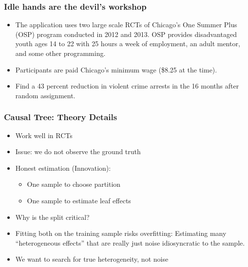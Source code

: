 \documentclass[
  shownotes,
  xcolor={svgnames},
  hyperref={colorlinks,citecolor=DarkBlue,linkcolor=DarkRed,urlcolor=DarkBlue}
  , aspectratio=169]{beamer}
\begin{document}

\begin{frame}[fragile]
\frametitle{Idle hands are the devil's workshop}

\begin{itemize}

  \item The application uses two large scale RCTs of Chicago's One Summer Plus (OSP) program conducted in 2012 and 2013. OSP provides disadvantaged youth ages 14 to 22 with 25 hours a week of employment, an adult mentor, and some other programming. 
  \medskip
  \item Participants are paid Chicago's minimum wage (\$8.25 at the time). 
  \medskip
  \item Find  a 43 percent reduction in violent crime arrests in the 16 months after random assignment. 

\end{itemize}




\end{frame}

\begin{frame}[fragile]
\frametitle{Causal Tree: Theory Details}



\begin{itemize}
  \item Work well in RCTs
  \medskip
  \item Issue: we do not observe the ground truth
  \medskip
  \item Honest estimation (Innovation):
    \begin{itemize}
      \item One sample to choose partition 
      \medskip
      \item One sample to estimate leaf effects
      \medskip
    \end{itemize}
  \item Why is the split critical?
  \medskip
  \item Fitting both on the training sample risks overfitting: Estimating many “heterogeneous effects” that are really just noise idiosyncratic to the sample.
  \medskip
  \item We want to search for true heterogeneity, not noise
\end{itemize}

\end{frame}
\end{document}
